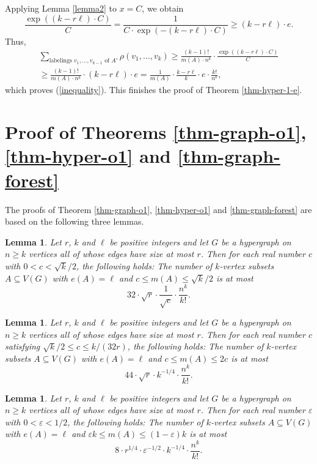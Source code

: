 \documentclass[11pt]{article}
\newtheorem{lemma}[theorem]{Lemma}
\theoremstyle{definition}
\numberwithin{equation}{section}
\begin{document}
Applying Lemma \ref{lemma2} to $x=C$, we obtain
\[\frac{\exp((k-r\ell)\cdot C)}{C}=\frac{1}{C\cdot \exp(-(k-r\ell)\cdot C)}\geq (k-r\ell)\cdot e.\]
Thus,
\begin{multline*}
\sum_{\text{labelings }v_1,\dots, v_{k-1}\text{ of } A'}\rho(v_1,\dots,v_k)\geq \frac{(k-1)!}{m(A)\cdot n^k}\cdot \frac{\exp\left((k-r\ell)\cdot C\right)}{C}\\
\geq \frac{(k-1)!}{m(A)\cdot n^k}\cdot (k-r\ell)\cdot e=\frac{1}{m(A)} \cdot \frac{k-r\ell}{k}\cdot e\cdot \frac{k!}{n^k},
\end{multline*}
which proves (\ref{inequality}). This finishes the proof of Theorem \ref{thm-hyper-1-e}.

\section{Proof of Theorems \ref{thm-graph-o1}, \ref{thm-hyper-o1} and \ref{thm-graph-forest}}\label{sect-proof-o1}

The proofs of Theorem \ref{thm-graph-o1}, \ref{thm-hyper-o1} and \ref{thm-graph-forest} are based on the following three lemmas.

\begin{lemma}\label{propo-1}Let $r$, $k$ and $\ell$ be positive integers and let $G$ be a hypergraph on $n \geq k$ vertices all of whose edges have size at most $r$. Then for each real number $c$ with $0<c<\sqrt{k}/2$, the following holds: The number of $k$-vertex subsets $A\subseteq V(G)$ with $e(A)=\ell$ and $c\leq m(A)\leq \sqrt{k}/2$ is at most
\[32\cdot \sqrt{r}\cdot \frac{1}{\sqrt{c}}\cdot \frac{n^k}{k!}.\]
\end{lemma}

\begin{lemma}\label{propo-2}Let $r$, $k$ and $\ell$ be positive integers  and let $G$ be a hypergraph on $n \geq k$ vertices all of whose edges have size at most $r$. Then for each real number $c$ satisfying $\sqrt{k}/2\leq c\leq k/(32r)$, the following holds: The number of $k$-vertex subsets $A\subseteq V(G)$ with $e(A)=\ell$ and $c\leq m(A)\leq 2c$ is at most
\[44\cdot \sqrt{r}\cdot k^{-1/4}\cdot \frac{n^k}{k!}.\]
\end{lemma}

\begin{lemma}\label{propo-3}Let $r$, $k$ and $\ell$ be positive integers and let $G$ be a hypergraph on $n \geq k$ vertices all of whose edges have size at most $r$. Then for each real number $\varepsilon$ with $0<\varepsilon<1/2$, the following holds: The number of $k$-vertex subsets $A\subseteq V(G)$ with $e(A)=\ell$ and $\varepsilon k \leq m(A)\leq (1-\varepsilon) k$ is at most
\[8\cdot r^{1/4}\cdot \varepsilon^{-1/2}\cdot k^{-1/4}\cdot \frac{n^k}{k!}.\]
\end{lemma}
\end{document}
